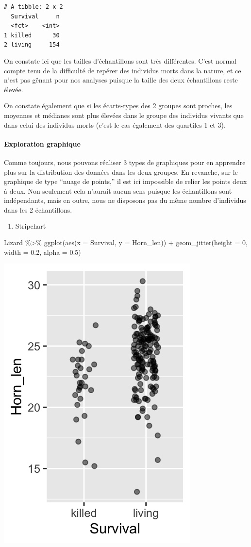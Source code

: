 \documentclass[
  a4paper,
]{article}
\newenvironment{Shaded}{\begin{snugshade}}{\end{snugshade}}
\newcommand{\AttributeTok}[1]{\textcolor[rgb]{0.00,0.34,0.68}{#1}}
\newcommand{\DecValTok}[1]{\textcolor[rgb]{0.69,0.50,0.00}{#1}}
\newcommand{\FloatTok}[1]{\textcolor[rgb]{0.69,0.50,0.00}{#1}}
\newcommand{\FunctionTok}[1]{\textcolor[rgb]{0.39,0.29,0.61}{#1}}
\newcommand{\NormalTok}[1]{\textcolor[rgb]{0.12,0.11,0.11}{#1}}
\newcommand{\SpecialCharTok}[1]{\textcolor[rgb]{0.24,0.68,0.91}{#1}}
\providecommand{\tightlist}{%
  \setlength{\itemsep}{0pt}\setlength{\parskip}{0pt}}
\begin{document}
\begin{verbatim}
# A tibble: 2 x 2
  Survival     n
  <fct>    <int>
1 killed      30
2 living     154
\end{verbatim}

On constate ici que les tailles d'échantillons sont très différentes. C'est normal compte tenu de la difficulté de repérer des individus morts dans la nature, et ce n'est pas gênant pour nos analyses puisque la taille des deux échantillons reste élevée.

On constate également que si les écarts-types des 2 groupes sont proches, les moyennes et médianes sont plus élevées dans le groupe des individus vivants que dans celui des individus morts (c'est le cas également des quartiles 1 et 3).

\hypertarget{exploration-graphique-2}{%
\paragraph{Exploration graphique}\label{exploration-graphique-2}}

Comme toujours, nous pouvons réaliser 3 types de graphiques pour en apprendre plus sur la distribution des données dans les deux groupes. En revanche, sur le graphique de type ``nuage de points,'' il est ici impossible de relier les points deux à deux. Non seulement cela n'aurait aucun sens puisque les échantillons sont indépendants, mais en outre, nous ne disposons pas du même nombre d'individus dans les 2 échantillons.

\begin{enumerate}
\def\labelenumi{\arabic{enumi}.}
\tightlist
\item
  Stripchart
\end{enumerate}

\begin{Shaded}
\begin{Highlighting}[]
\NormalTok{Lizard }\SpecialCharTok{\%\textgreater{}\%} 
  \FunctionTok{ggplot}\NormalTok{(}\FunctionTok{aes}\NormalTok{(}\AttributeTok{x =}\NormalTok{ Survival, }\AttributeTok{y =}\NormalTok{ Horn\_len)) }\SpecialCharTok{+}
  \FunctionTok{geom\_jitter}\NormalTok{(}\AttributeTok{height =} \DecValTok{0}\NormalTok{, }\AttributeTok{width =} \FloatTok{0.2}\NormalTok{, }\AttributeTok{alpha =} \FloatTok{0.5}\NormalTok{)}
\end{Highlighting}
\end{Shaded}

\begin{center}\includegraphics[width=0.25\linewidth]{figure/unnamed-chunk-50-1} \end{center}
\end{document}
